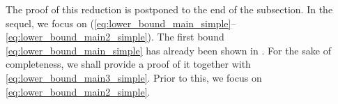 \documentclass[twoside,11pt]{article}
\def\beqn{\begin{eqnarray*}}
\def\eeqn{\end{eqnarray*}}
\newcommand{\<}{\langle}
\renewcommand{\>}{\rangle}
\begin{document}
\begin{comment}

\begin{proof}[Proof of Theorem \ref{prp:lower}]
If $k_0\leq \sqrt{n}$, we apply the monotony property \eqref{eq:subproblem} to derive  
\[\rho_{\gamma}^{*2}[n,k_0,\Delta]\geq \rho_{\gamma}^{*2}[n-k_0,0,\Delta]\geq \Delta \log\Big[1+ \frac{ \sqrt{n-k_0}}{4\Delta} \Big]\geq \Delta \log\Big[1+ \frac{ \sqrt{n}}{8\Delta} \Big] \]
Turning to \eqref{eq:lower_bound_main2}, we observe that the case $32\sqrt{(n-k_0)\wedge  k_0}\leq \Delta\leq k_0$ is a consequence of \eqref{eq:lower_bound_main2_simple} whereas the case $\Delta> k_0$ is a consequence of $\rho_{\gamma}^{*}[n,k_0,\Delta]\geq \rho_{\gamma}^{*}[n,k_0,k_0]$ (Lemma \ref{lem:reduction}). Thus, it suffices to consider the case $\Delta < 32\sqrt{(n-k_0)\wedge  k_0}$. First assume that $k_0\leq n/2$ and define $k'_0= \lceil \Delta^2/64 \rceil$. If $k'_0> 2\sqrt{n}$, then \eqref{eq:subproblem} ensures that 
\beqn 
 \rho_{\gamma}^{*2}[n,k_0,\Delta]&\geq& \rho_{\gamma}^{*2}[n-k_0+k'_0,k'_0,\Delta]\geq c \Delta \left[\frac{\log^2\big[1+  \frac{k'_0}{\Delta}\big]}{\log\big[1+ \frac{k_0}{\sqrt{n-k_0+k'_0}}\big]}\wedge \log\big[1+ \frac{k'_0}{\Delta}\big]\right]\\
 &\geq & c'\Delta \left[\frac{\log^2\big[1+  \frac{k_0}{\Delta}\big]}{\log\big[1+ \frac{k_0}{\sqrt{n}}\big]}\wedge \log\big[1+ \frac{k_0}{\Delta}\big]\right]\ ,
\eeqn 
since $k'_0/\Delta \asymp \Delta\gtrsim \frac{k_0}{\Delta}$. If $k'_0< 2\sqrt{n}$, this ensure that $\Delta\leq c'' n^{1/4}$. From \eqref{eq:subproblem} and \eqref{eq:lower_bound_main_simple}, we deduce that 
\beqn
\rho_{\gamma}^{*2}[n,k_0,\Delta]&\geq& \rho_{\gamma}^{*2}[n-k_0,0,\Delta]\geq \Delta \log\Big[1+ \frac{ \sqrt{n-k_0}}{4\Delta} \Big]\geq c \log(n) \geq c' \log\big[1+ \frac{k_0}{\Delta}\big]\ .
\eeqn 
The case $\Delta < 32\sqrt{n-k_0}$ and $k_0> n/2$ is handled similarly gathering the reduction \eqref{eq:reduction_sample} with the minimax lower bounds \eqref{eq:lower_bound_main3_simple} and \eqref{eq:lower_bound_main2_simple}.
 
\end{proof}
 
\end{comment}


The proof of this reduction is postponed to the end of the subsection. In the sequel, we focus on (\ref{eq:lower_bound_main_simple}--\ref{eq:lower_bound_main2_simple}).
The first bound \eqref{eq:lower_bound_main_simple} has already been shown in \cite{baraud02}. For the sake of completeness, we shall provide a proof of it together with \eqref{eq:lower_bound_main3_simple}. Prior to this, we focus on \eqref{eq:lower_bound_main2_simple}.
\end{document}
